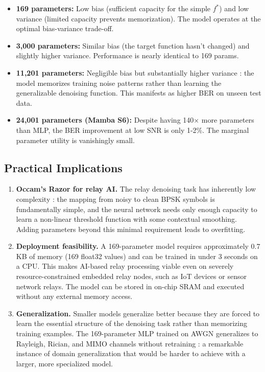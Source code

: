 \begin{itemize}
\tightlist
\item
  \textbf{169 parameters:} Low bias (sufficient capacity for the simple \(f^*\)) and low variance (limited capacity prevents memorization). The model operates at the optimal bias-variance trade-off.
\item
  \textbf{3,000 parameters:} Similar bias (the target function hasn't changed) and slightly higher variance. Performance is nearly identical to 169 params.
\item
  \textbf{11,201 parameters:} Negligible bias but substantially higher variance : the model memorizes training noise patterns rather than learning the generalizable denoising function. This manifests as higher BER on unseen test data.
\item
  \textbf{24,001 parameters (Mamba S6):} Despite having 140× more parameters than MLP, the BER improvement at low SNR is only 1-2\%. The marginal parameter utility is vanishingly small.
\end{itemize}

\subsection{Practical Implications}\label{sec:practical-implications}

\begin{enumerate}
\def\labelenumi{\arabic{enumi}.}
\item
  \textbf{Occam's Razor for relay AI.} The relay denoising task has inherently low complexity : the mapping from noisy to clean BPSK symbols is fundamentally simple, and the neural network needs only enough capacity to learn a non-linear threshold function with some contextual smoothing. Adding parameters beyond this minimal requirement leads to overfitting.
\item
  \textbf{Deployment feasibility.} A 169-parameter model requires approximately 0.7 KB of memory (169 float32 values) and can be trained in under 3 seconds on a CPU. This makes AI-based relay processing viable even on severely resource-constrained embedded relay nodes, such as IoT devices or sensor network relays. The model can be stored in on-chip SRAM and executed without any external memory access.
\item
  \textbf{Generalization.} Smaller models generalize better because they are forced to learn the essential structure of the denoising task rather than memorizing training examples. The 169-parameter MLP trained on AWGN generalizes to Rayleigh, Rician, and MIMO channels without retraining : a remarkable instance of domain generalization that would be harder to achieve with a larger, more specialized model.
\end{enumerate}

